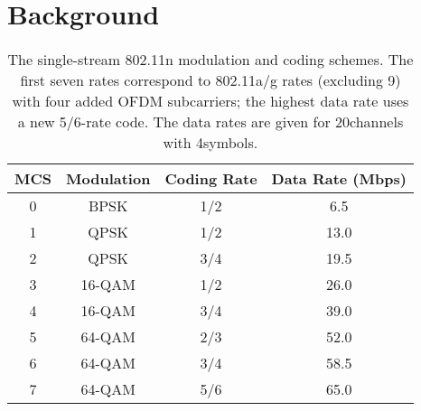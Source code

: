 \ifx\mainfile\undefined

\setcounter{chapter}{1} %
\fi

\cleardoublepage
\chapter{Background}
\label{chap:background}

\begin{table}
\centering
\begin{tabular}{cccc}
\toprule
MCS & Modulation & Coding Rate & Data Rate (Mbps) \\
\midrule
0 & BPSK & 1/2 & 6.5 \\
1 & QPSK & 1/2 & 13.0\\
2 & QPSK & 3/4 & 19.5\\
3 & 16-QAM & 1/2 & 26.0\\
4 & 16-QAM & 3/4 & 39.0\\
5 & 64-QAM & 2/3 & 52.0\\
6 & 64-QAM & 3/4 & 58.5\\
7 & 64-QAM & 5/6 & 65.0\\
\bottomrule
\end{tabular}
\caption[The 802.11n single-stream rates.]{\label{tab:siso_mcs} The single-stream 802.11n modulation and coding schemes. The first seven rates correspond to 802.11a/g rates (excluding 9\Mbps) with four added OFDM subcarriers; the highest data rate uses a new 5/6-rate code. The data rates are given for 20\MHz channels with 4\ms symbols.}
\end{table}

